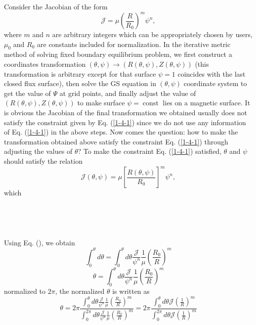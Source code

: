 \documentclass{article}
\newcommand{\tmop}[1]{\ensuremath{\operatorname{#1}}}
\begin{document}
Consider the Jacobian of the form
\begin{equation}
  \label{1-4-1} \mathcal{J}= \mu \left( \frac{R}{R_0} \right)^m \psi^n,
\end{equation}
where $m$ and $n$ are arbitrary integers which can be appropriately chosen by
users, $\mu_0$ and $R_0$ are constants included for normalization. In the
iterative metric method of solving fixed boundary equilibrium problem, we
first construct a coordinates transformation $(\theta, \psi) \rightarrow (R
(\theta, \psi), Z (\theta, \psi))$ (this transformation is arbitrary except
for that surface $\psi = 1$ coincides with the last closed flux surface), then
solve the GS equation in $(\theta, \psi)$ coordinate system to get the value
of $\Psi$ at grid points, and finally adjust the value of $(R (\theta, \psi),
Z (\theta, \psi))$ to make surface $\psi = \tmop{const}$ lies on a magnetic
surface. It is obvious the Jacobian of the final transformation we obtained
usually does not satisfy the constraint given by Eq. (\ref{1-4-1}) since we do
not use any information of Eq. (\ref{1-4-1}) in the above steps. Now comes the
question: how to make the transformation obtained above satisfy the constraint
Eq. (\ref{1-4-1}) through adjusting the values of $\theta$? To make the
constraint Eq. (\ref{1-4-1}) satisfied, $\theta$ and $\psi$ should satisfy the
relation
\begin{equation}
  \mathcal{J} (\theta, \psi) = \mu \left[ \frac{R (\theta, \psi)}{R_0}
  \right]^m \psi^n,
\end{equation}
which

\

\

Using Eq. (), we obtain
\[ \int_0^{\theta} d \theta = \int_0^{\theta} d \theta
   \frac{\mathcal{J}}{\psi^n} \frac{1}{\mu} \left( \frac{R_0}{R} \right)^m \]
\begin{equation}
  \theta = \int_0^{\theta} d \theta \frac{\mathcal{J}}{\psi^n} \frac{1}{\mu}
  \left( \frac{R_0}{R} \right)^m
\end{equation}
normalized to $2 \pi$, the normalized $\theta$ is written as
\begin{equation}
  \theta = 2 \pi \frac{\int_0^{\theta} d \theta \frac{\mathcal{J}}{\psi^n}
  \frac{1}{\mu} \left( \frac{R_0}{R} \right)^m}{\int_0^{2 \pi} d \theta
  \frac{\mathcal{J}}{\psi^n} \frac{1}{\mu} \left( \frac{R_0}{R} \right)^m} = 2
  \pi \frac{\int_0^{\theta} d \theta \mathcal{J} \left( \frac{1}{R}
  \right)^m}{\int_0^{2 \pi} d \theta \mathcal{J} \left( \frac{1}{R} \right)^m}
\end{equation}
\end{document}
